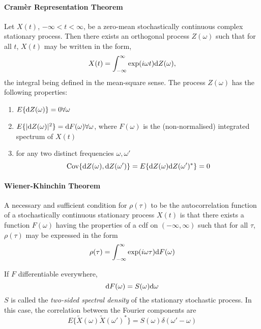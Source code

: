 \paragraph{Cram\`er Representation Theorem} Let $X(t)$, $-\infty < t < \infty$, be a zero-mean stochastically continuous complex stationary process. Then there exists an orthogonal process $Z(\omega)$ such that for all $t$, $X(t)$ may be written in the form,
\begin{equation}
X(t)=\int^{\infty}_{-\infty}\exp(i\omega t) {\mbox{d}} Z(\omega),
\end{equation}
the integral being defined in the mean-square sense. The process $Z(\omega)$ has the following properties:
\begin{enumerate}
\item $E\{{\mbox{d}} Z(\omega) \} = 0 \forall \omega$
\item $E\{|{\mbox{d}} Z(\omega)|^2 \} = {\mbox{d}} F(\omega) \forall \omega$, where $F(\omega)$ is the (non-normalised) integrated spectrum of $X(t)$
\item for any two distinct frequencies $\omega, \omega'$
\begin{equation}
\mbox{Cov}\{{\mbox{d}} Z(\omega), {\mbox{d}} Z(\omega') \} = E\{ {\mbox{d}} Z(\omega) {\mbox{d}} Z(\omega')^* \} =0
\end{equation} 
\end{enumerate}

\paragraph{Wiener-Khinchin Theorem} A necessary and sufficient condition for $\rho(\tau)$ to be the autocorrelation function of a stochastically continuous stationary process $X(t)$ is that there exists a function $F(\omega)$ having the properties of a cdf on $(-\infty, \infty)$ such that for all $\tau$, $\rho(\tau)$ may be expressed in the form
\begin{equation}
\rho(\tau)=\int^{\infty}_{-\infty}\exp(i\omega \tau) {\mbox{d}} F(\omega)
\end{equation}

If $F$ differentiable everywhere, 
\begin{equation}
{\mbox{d}} F(\omega)=S(\omega) {\mbox{d}} \omega
\end{equation}
$S$ is called the \textit{two-sided spectral density} of the stationary stochastic process. In this case, the correlation between the Fourier components are 
\begin{equation}
E\{\tilde{X}(\omega) \tilde{X}(\omega ' )^* \} = S(\omega) \delta(\omega ' -\omega)
\end{equation}

